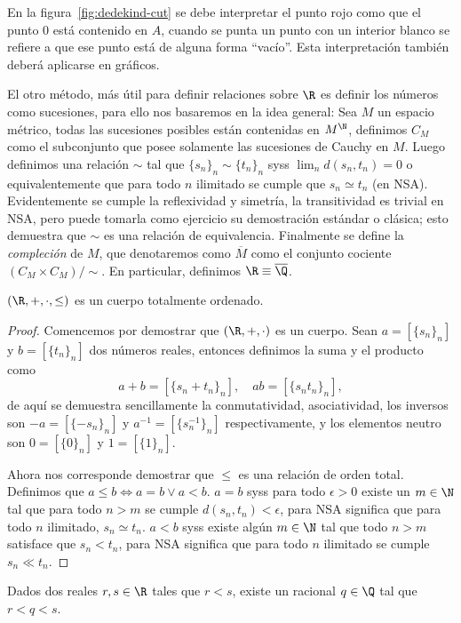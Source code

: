 \documentclass[11pt,oneside,a4paper]{book}
\begin{document}
En la figura~\ref{fig:dedekind-cut} se debe interpretar el punto rojo como que el punto 0 está contenido en $A$, cuando se punta un punto con un interior blanco se refiere a que ese punto está de alguna forma ``vacío''. Esta interpretación también deberá aplicarse en gráficos.

El otro método, más útil para definir relaciones sobre $\R$ es definir los números como sucesiones, para ello nos basaremos en la idea general: Sea $M$ un espacio métrico, todas las sucesiones posibles están contenidas en $M^\N$, definimos $C_M$ como el subconjunto que posee solamente las sucesiones de Cauchy en $M$. Luego definimos una relación $\sim$ tal que $\{s_n\}_n\sim\{t_n\}_n$ syss $\lim_n d(s_n,t_n)=0$ o equivalentemente que para todo $n$ ilimitado se cumple que $s_n\simeq t_n$ (en NSA). Evidentemente se cumple la reflexividad y simetría, la transitividad es trivial en NSA, pero puede tomarla como ejercicio su demostración estándar o clásica; esto demuestra que $\sim$ es una relación de equivalencia. Finalmente se define la \textit{compleción} de $M$, que denotaremos como $\overline{M}$ como el conjunto cociente $(C_M\times C_M)/\sim$. En particular, definimos $\R\equiv\overline{\Q}$.
\begin{thm}
$(\R,+,\cdot,\leq)$ es un cuerpo totalmente ordenado.
\end{thm}
\begin{proof}
Comencemos por demostrar que $(\R,+,\cdot)$ es un cuerpo. Sean $a=[\{s_n\}_n]$ y $b=[\{t_n\}_n]$ dos números reales, entonces definimos la suma y el producto como
$$a+b=[\{s_n+t_n\}_n],\quad ab=[\{s_nt_n\}_n],$$
de aquí se demuestra sencillamente la conmutatividad, asociatividad, los inversos son $-a=[\{-s_n\}_n]$ y $a^{-1}=[\{s_n^{-1}\}_n]$ respectivamente, y los elementos neutro son $0=[\{0\}_n]$ y $1=[\{1\}_n]$.

Ahora nos corresponde demostrar que $\leq$ es una relación de orden total. Definimos que $a\leq b\iff a=b\vee a\lt b$. $a=b$ syss para todo $\epsilon\gt 0$ existe un $m\in\N$ tal que para todo $n\gt m$ se cumple $d(s_n,t_n)\lt\epsilon$, para NSA significa que para todo $n$ ilimitado, $s_n\simeq t_n$. $a\lt b$ syss existe algún $m\in\N$ tal que todo $n\gt m$ satisface que $s_n\lt t_n$, para NSA significa que para todo $n$ ilimitado se cumple $s_n\ll t_n$.
\end{proof}
\begin{thm}[Densidad de $\Q$ en $\R$]\label{thm:rational-inside}
Dados dos reales $r,s\in\R$ tales que $r\lt s$, existe un racional $q\in\Q$ tal que $r\lt q\lt s$.
\end{thm}
\end{document}
